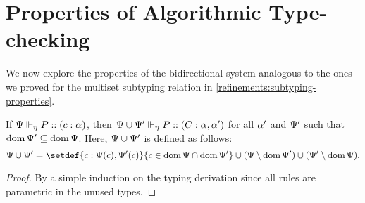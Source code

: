 
\section{Properties of Algorithmic Type-checking}

We now explore the properties of the bidirectional system analogous to the ones we proved for the multiset subtyping relation in \cref{refinements:subtyping-properties}.

\begin{lemma}[Weakening]
  If ${\Psi} \Vdash_{\eta} P :: (c : \alpha)$, then ${\Psi \cup \Psi'} \Vdash_{\eta} P :: (C : \alpha, \alpha')$ for all $\alpha'$ and $\Psi'$ such that $\operatorname{dom}{\Psi'} \subseteq \operatorname{dom}\Psi$. Here, $\Psi \cup \Psi'$ is defined as follows:
  $$ \ctx \concat \ctx' = \setdef{c : \lookup \ctx c, \lookup {\ctx'} c}{c \in \dom\ctx \cap \dom{\ctx'}} \cup \parens{\ctx \setminus \dom{\ctx'}} \cup \parens{\ctx' \setminus \dom{\ctx}}.
  $$
\end{lemma}
\begin{proof}
  By a simple induction on the typing derivation since all rules are parametric in the unused types.
\end{proof}


